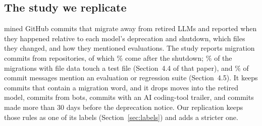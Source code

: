 \subsection{The study we replicate}

\citet{kim2026retires} mined GitHub commits that migrate away from retired LLMs and reported when they happened relative to each model's deprecation and shutdown, which files they changed, and how they mentioned evaluations. The study reports \KimCommits{} migration commits from \KimRepos{} repositories, of which \KimAfterShutdown\% come after the shutdown; \KimTouchTest\% of the \KimFileLevel{} migrations with file data touch a test file (Section~4.4 of that paper), and \KimMentionEval\% of commit messages mention an evaluation or regression suite (Section~4.5). It keeps commits that contain a migration word, and it drops moves into the retired model, commits from bots, commits with an AI coding-tool trailer, and commits made more than 30 days before the deprecation notice. Our replication keeps those rules as one of its labels (Section~\ref{sec:labels}) and adds a stricter one.
